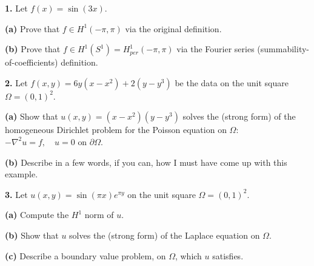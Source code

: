 \documentclass[11pt]{amsart}
\newcommand{\grad}{\nabla}
\newcommand{\prob}[1]{\bigskip\noindent\textbf{#1.}\quad }
\newcommand{\epart}[1]{\bigskip\noindent\textbf{(#1)}\quad }
\newcommand{\ds}{\displaystyle}
\begin{document}
\begin{center}
  \large
  \normalsize
\end{center}

\bigskip
\prob{1}  Let $f(x)=\sin(3x)$.

\epart{a} Prove that $f\in H^1(-\pi,\pi)$ via the original definition.

\vspace{30mm}

\epart{b} Prove that $f\in H^1(S^1)=H_{per}^1(-\pi,\pi)$ via the Fourier series (summability-of-coefficients) definition.

\vspace{60mm}

\prob{2}  Let $f(x,y)=6y(x-x^2) + 2(y-y^3)$ be the data on the unit square $\Omega=(0,1)^2$.

\epart{a} Show that $u(x,y)=(x-x^2)(y-y^3)$ solves the (strong form) of the homogeneous Dirichlet problem for the Poisson equation on $\Omega$: \quad $\ds -\grad^2 u = f, \quad u=0 \text{ on } \partial \Omega$.

\vspace{70mm}

\epart{b} Describe in a few words, if you can, how I must have come up with this example.

\vfill

\clearpage\newpage
\prob{3}  Let $u(x,y)=\sin(\pi x) e^{\pi y}$ on the unit square $\Omega=(0,1)^2$.

\epart{a} Compute the $H^1$ norm of $u$.

\vspace{100mm}

\epart{b} Show that $u$ solves the (strong form) of the Laplace equation on $\Omega$.

\vspace{70mm}

\epart{c} Describe a boundary value problem, on $\Omega$, which $u$ satisfies.

\vfill
\end{document}

